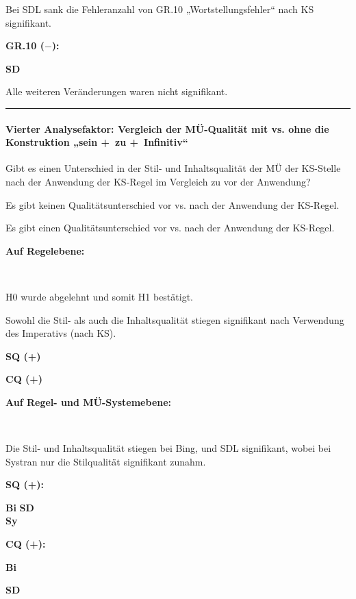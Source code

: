\medskip
\noindent
\parbox[t]{.8\textwidth}{
Bei SDL sank die Fehleranzahl von GR.10 „Wortstellungsfehler“ nach KS signifikant.
}
\parbox[t]{.04\textwidth}{}
\colorbox{smGreen}{\parbox[t]{.15\textwidth}{
{ \textbf{GR.10 ($-$):}}

\textbf{SD}
}}

\medskip
\noindent
\parbox[t]{.8\textwidth}{
Alle weiteren Veränderungen waren nicht signifikant.
}

\hrule
\paragraph*{Vierter Analysefaktor: Vergleich der MÜ-Qualität mit vs. ohne die Konstruktion „sein +~zu +~Infinitiv“}
\begin{description}[font=\normalfont\bfseries]
\item [Fragestellung:] Gibt es einen Unterschied in der Stil- und Inhaltsqualität der MÜ der KS-Stelle nach der Anwendung der KS-Regel im Vergleich zu vor der Anwendung?
\item [H0 --] Es gibt keinen Qualitätsunterschied vor vs. nach der Anwendung der KS-Regel.
\item [H1 --] Es gibt einen Qualitätsunterschied vor vs. nach der Anwendung der KS-Regel.
\item [Resultat]
\end{description}
\noindent
\parbox[t]{.75\textwidth}{\textbf{Auf Regelebene:}}\\
\parbox[t]{.75\textwidth}{
H0 wurde abgelehnt und somit H1 bestätigt.

Sowohl die Stil- als auch die Inhaltsqualität stiegen signifikant nach Verwendung des Imperativs (nach KS).
}
\parbox[t]{.04\textwidth}{}
\colorbox{smGreen}{\parbox[t]{.2\textwidth}{
{ \textbf{SQ (+)}}

 \textbf{CQ (+)}\\
}}

\noindent
\parbox[t]{.75\textwidth}{\textbf{Auf Regel- und MÜ-Systemebene:}}\\
\parbox[t]{.75\textwidth}{
Die Stil- und Inhaltsqualität stiegen bei Bing, und SDL signifikant, wobei bei Systran nur die Stilqualität signifikant zunahm.
}
\parbox[t]{.04\textwidth}{}
\colorbox{smGreen}{\parbox[t]{.09\textwidth}{
{ \textbf{SQ (+):}}

{ \textbf{Bi}}{ \textbf{SD}}\\\textbf{Sy}
}}
\colorbox{smGreen}{\parbox[t]{.09\textwidth}{{ \textbf{CQ (+):}}

{ \textbf{Bi}}

\textbf{SD}
\vspace{2.5pt}
}}


